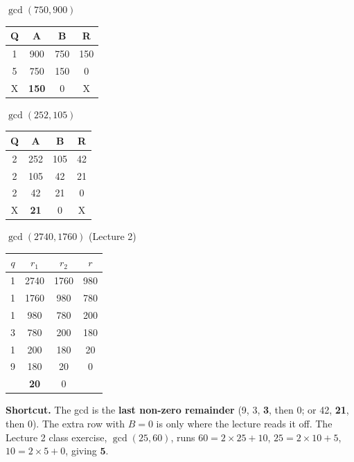 \begin{center}\small
\begin{minipage}[t]{0.27\textwidth}
\centering
$\gcd(750, 900)$\\[2pt]
\begin{tabular}{cccc}
\toprule
Q&A&B&R\\
\midrule
1&900&750&150\\
5&750&150&0\\
X&\textbf{150}&0&X\\
\bottomrule
\end{tabular}
\end{minipage}\hfill
\begin{minipage}[t]{0.27\textwidth}
\centering
$\gcd(252, 105)$\\[2pt]
\begin{tabular}{cccc}
\toprule
Q&A&B&R\\
\midrule
2&252&105&42\\
2&105&42&21\\
2&42&21&0\\
X&\textbf{21}&0&X\\
\bottomrule
\end{tabular}
\end{minipage}\hfill
\begin{minipage}[t]{0.36\textwidth}
\centering
$\gcd(2740, 1760)$ (Lecture 2)\\[2pt]
\begin{tabular}{cccc}
\toprule
$q$&$r_1$&$r_2$&$r$\\
\midrule
1&2740&1760&980\\
1&1760&980&780\\
1&980&780&200\\
3&780&200&180\\
1&200&180&20\\
9&180&20&0\\
&\textbf{20}&0&\\
\bottomrule
\end{tabular}
\end{minipage}
\end{center}
\textbf{Shortcut.} The gcd is the \textbf{last non-zero remainder} (9, 3, \textbf{3}, then 0; or 42, \textbf{21}, then 0). The extra row with $B = 0$ is only where the lecture reads it off. The Lecture 2 class exercise, $\gcd(25, 60)$, runs $60 = 2 \times 25 + 10$, $25 = 2 \times 10 + 5$, $10 = 2 \times 5 + 0$, giving $\mathbf{5}$.


